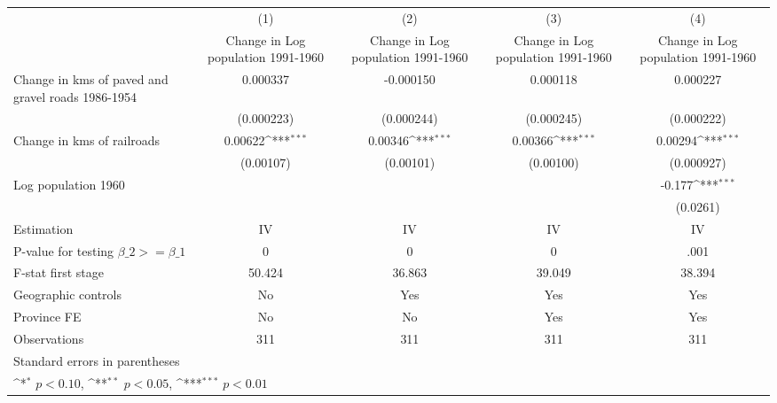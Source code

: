 {
\def\sym#1{\ifmmode^{#1}\else\(^{#1}\)\fi}
\begin{tabular}{l*{4}{c}}
\hline\hline
                    &\multicolumn{1}{c}{(1)}&\multicolumn{1}{c}{(2)}&\multicolumn{1}{c}{(3)}&\multicolumn{1}{c}{(4)}\\
                    &\multicolumn{1}{c}{Change in Log population 1991-1960}&\multicolumn{1}{c}{Change in Log population 1991-1960}&\multicolumn{1}{c}{Change in Log population 1991-1960}&\multicolumn{1}{c}{Change in Log population 1991-1960}\\
\hline
Change in kms of paved and gravel roads 1986-1954&    0.000337         &   -0.000150         &    0.000118         &    0.000227         \\
                    &  (0.000223)         &  (0.000244)         &  (0.000245)         &  (0.000222)         \\
[1em]
Change in kms of railroads&     0.00622\sym{***}&     0.00346\sym{***}&     0.00366\sym{***}&     0.00294\sym{***}\\
                    &   (0.00107)         &   (0.00101)         &   (0.00100)         &  (0.000927)         \\
[1em]
Log population 1960 &                     &                     &                     &      -0.177\sym{***}\\
                    &                     &                     &                     &    (0.0261)         \\
\hline
Estimation          &          IV         &          IV         &          IV         &          IV         \\
P-value for testing $\beta\_2 >= \beta\_1$&           0         &           0         &           0         &        .001         \\
F-stat first stage  &      50.424         &      36.863         &      39.049         &      38.394         \\
Geographic controls &          No         &         Yes         &         Yes         &         Yes         \\
Province FE         &          No         &          No         &         Yes         &         Yes         \\
Observations        &         311         &         311         &         311         &         311         \\
\hline\hline
\multicolumn{5}{l}{\footnotesize Standard errors in parentheses}\\
\multicolumn{5}{l}{\footnotesize \sym{*} \(p<0.10\), \sym{**} \(p<0.05\), \sym{***} \(p<0.01\)}\\
\end{tabular}
}
